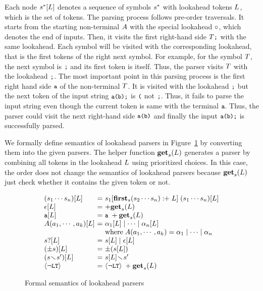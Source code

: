 Each node \( s^*[L] \) denotes a sequence of symbols \( s^* \) with
lookahead tokens \( L \), which is the set of tokens.
The parsing process follows pre-order traversals.
It starts from the starting non-terminal \( A \) with the special
lookahead \( \circ \), which denotes the end of inputs.
Then, it visits the first right-hand side \( T \texttt{\small;} \) with the same lookahead.
Each symbol will be visited with the corresponding lookahead, that is the
first tokens of the right next symbol.
For example, for the symbol \( T \), the next symbol is \( \texttt{\small;} \)
and its first token is itself. Thus, the parser visits \( T \)
with the lookahead \( \texttt{\small;} \). The most important point in this parsing process
is the first right hand side \( \texttt{\small a} \) of the non-terminal \( T \).
It is visited with the lookahead \( \texttt{\small;} \) but the next token of the input string
\( \texttt{\small a(b);} \) is \( \texttt{\small(} \) not \( \texttt{\small;} \).
Thus, it fails to parse the input string even though the current token is
same with the terminal \( \texttt{\small a} \).
Thus, the parser could visit the next right-hand side \( \texttt{\small a}\texttt{\small(}\texttt{\small b}\texttt{\small)} \)
and finally the input \( \texttt{\small a(b);} \) is successfully parsed.

We formally define semantics of lookahead parsers
in Figure~\ref{fig:laparser} by converting them into the given parsers.
The helper function \( \textbf{get}_s(L) \) generates a parser by combining all
tokens in the lookahead \( L \) using prioritized choices.
In this case, the order does not change the semantics of lookahead parsers
because \( \textbf{get}_s(L) \) just check whether it contains the given token or not.

\begin{figure}
\centering
\[
  \begin{array}{l@{~}c@{~}l}
    (\symb_1 \cdots \symb_n)[\la] &=&
    \symb_1[\symbfirst{\symb_2 \cdots \symb_n} \firstplus \la] \;
    (\symb_1 \cdots \symb_n)[\la]\\
    \epsilon[\la] &=& +\getlap{\la}\\
    \T{a}[\la] &=& \T{a} \; +\getlap{\la} \\
    \NT{A}(\argument_1, \cdots, \argument_k)[\la] &=&
    \rhs_1[\la] \mid \cdots \mid \rhs_n[\la]\\
    && \text{where} \; \NT{A}(\argument_1, \cdots, \argument_k) =
    \rhs_1 \mid \cdots \mid \rhs_n\\

    \symb?[\la] &=& \symb[\la] \mid \epsilon[\la]\\
    (\pm\symb)[\la] &=& \pm(\symb[\la]) \\
    (\symb \butnot \symb')[\la] &=& \symb[\la] \butnot \symb'\\
    \nolt &=& \nolt \; +\getlap{\la}\\
  \end{array}
\]
\caption{Formal semantics of lookahead parsers}
\label{fig:laparser}
\end{figure}


